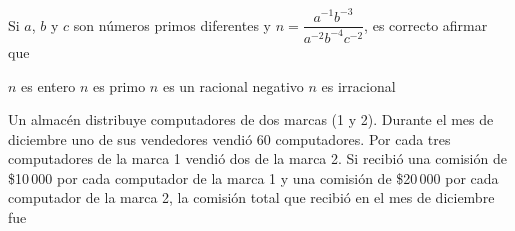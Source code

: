 \documentclass[10pt,addpoints]{exam}
\begin{document}
\begin{questions}
\question
Si $a$, $b$ y $c$ son números primos diferentes y $n=\dfrac{a^{-1}b^{-3}}{a^{-2}b^{-4}c^{-2}}$, es correcto afirmar que
\begin{choices}
\begin{multicols}{2}
 \CorrectChoice $n$ es entero
 \choice $n$ es primo
 \choice $n$ es un racional negativo
 \choice $n$ es irracional
\end{multicols}
\end{choices}
\question Un almacén distribuye computadores de dos marcas (1 y 2). Durante el mes de diciembre uno de sus vendedores vendió 60 computadores. Por cada tres computadores de la marca 1 vendió dos de la marca 2. Si recibió una comisión de \$10\,000 por cada computador de la marca 1 y una comisión de \$20\,000 por cada computador de la marca 2, la comisión total que recibió en el mes de diciembre fue


\end{questions}
\end{document}
